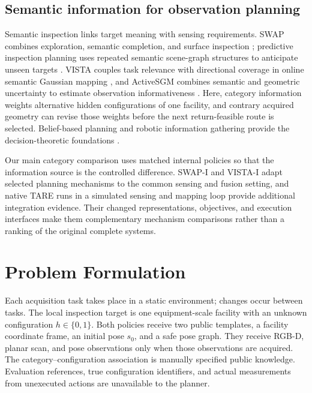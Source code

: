 \documentclass[11pt,a4paper]{article}
\providecommand{\hypertarget}[2]{#2}
\begin{document}
\hypertarget{semantic-information-for-observation-planning}{%
\subsection{Semantic information for observation planning}\label{semantic-information-for-observation-planning}}

Semantic inspection links target meaning with sensing requirements. SWAP combines exploration, semantic completion, and surface inspection \cite{ref2}; predictive inspection planning uses repeated semantic scene-graph structures to anticipate unseen targets \cite{ref7}. VISTA couples task relevance with directional coverage in online semantic Gaussian mapping \cite{ref3}, and ActiveSGM combines semantic and geometric uncertainty to estimate observation informativeness \cite{ref8}. Here, category information weights alternative hidden configurations of one facility, and contrary acquired geometry can revise those weights before the next return-feasible route is selected. Belief-based planning and robotic information gathering provide the decision-theoretic foundations \cite{ref12,ref13}.

Our main category comparison uses matched internal policies so that the information source is the controlled difference. SWAP-I and VISTA-I adapt selected planning mechanisms to the common sensing and fusion setting, and native TARE runs in a simulated sensing and mapping loop provide additional integration evidence. Their changed representations, objectives, and execution interfaces make them complementary mechanism comparisons rather than a ranking of the original complete systems.

\hypertarget{problem-formulation}{%
\section{Problem Formulation}\label{problem-formulation}}

Each acquisition task takes place in a static environment; changes occur between tasks. The local inspection target is one equipment-scale facility with an unknown configuration \(h\in\{0,1\}\). Both policies receive two public templates, a facility coordinate frame, an initial pose \(s_0\), and a safe pose graph. They receive RGB-D, planar scan, and pose observations only when those observations are acquired. The category--configuration association is manually specified public knowledge. Evaluation references, true configuration identifiers, and actual measurements from unexecuted actions are unavailable to the planner.
\end{document}
